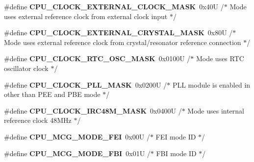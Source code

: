 \begin{DoxyCompactItemize}
\item 
\#define {\bfseries C\+P\+U\+\_\+\+C\+L\+O\+C\+K\+\_\+\+E\+X\+T\+E\+R\+N\+A\+L\+\_\+\+C\+L\+O\+C\+K\+\_\+\+M\+A\+SK}~0x40\+U     /$\ast$ Mode uses external reference clock from external clock input $\ast$/\hypertarget{group___c_p_u___config__module_gaea614d51f93bbbf4e9b841ec5ac08a94}{}\label{group___c_p_u___config__module_gaea614d51f93bbbf4e9b841ec5ac08a94}

\item 
\#define {\bfseries C\+P\+U\+\_\+\+C\+L\+O\+C\+K\+\_\+\+E\+X\+T\+E\+R\+N\+A\+L\+\_\+\+C\+R\+Y\+S\+T\+A\+L\+\_\+\+M\+A\+SK}~0x80\+U     /$\ast$ Mode uses external reference clock from crystal/resonator reference connection $\ast$/\hypertarget{group___c_p_u___config__module_ga75a71480ebfa4d135730c096ad9094f8}{}\label{group___c_p_u___config__module_ga75a71480ebfa4d135730c096ad9094f8}

\item 
\#define {\bfseries C\+P\+U\+\_\+\+C\+L\+O\+C\+K\+\_\+\+R\+T\+C\+\_\+\+O\+S\+C\+\_\+\+M\+A\+SK}~0x0100\+U   /$\ast$ Mode uses R\+T\+C oscillator clock $\ast$/\hypertarget{group___c_p_u___config__module_ga82532a9c7aa992ee9af088093ce08a13}{}\label{group___c_p_u___config__module_ga82532a9c7aa992ee9af088093ce08a13}

\item 
\#define {\bfseries C\+P\+U\+\_\+\+C\+L\+O\+C\+K\+\_\+\+P\+L\+L\+\_\+\+M\+A\+SK}~0x0200\+U   /$\ast$ P\+L\+L module is enabled in other than P\+E\+E and P\+B\+E mode $\ast$/\hypertarget{group___c_p_u___config__module_ga868ba7d131389fdf1bd06a20a97f99d6}{}\label{group___c_p_u___config__module_ga868ba7d131389fdf1bd06a20a97f99d6}

\item 
\#define {\bfseries C\+P\+U\+\_\+\+C\+L\+O\+C\+K\+\_\+\+I\+R\+C48\+M\+\_\+\+M\+A\+SK}~0x0400\+U   /$\ast$ Mode uses internal reference clock 48\+M\+Hz $\ast$/\hypertarget{group___c_p_u___config__module_ga9080b2769aa853e62ccd6cb9403665bf}{}\label{group___c_p_u___config__module_ga9080b2769aa853e62ccd6cb9403665bf}

\item 
\#define {\bfseries C\+P\+U\+\_\+\+M\+C\+G\+\_\+\+M\+O\+D\+E\+\_\+\+F\+EI}~0x00\+U     /$\ast$ F\+E\+I mode I\+D $\ast$/\hypertarget{group___c_p_u___config__module_gaa1c54a34a3a0633690b64f60cadb7549}{}\label{group___c_p_u___config__module_gaa1c54a34a3a0633690b64f60cadb7549}

\item 
\#define {\bfseries C\+P\+U\+\_\+\+M\+C\+G\+\_\+\+M\+O\+D\+E\+\_\+\+F\+BI}~0x01\+U     /$\ast$ F\+B\+I mode I\+D $\ast$/\hypertarget{group___c_p_u___config__module_ga59f26013c4e3a47b6f36fafbe0600be1}{}\label{group___c_p_u___config__module_ga59f26013c4e3a47b6f36fafbe0600be1}


\end{DoxyCompactItemize}
